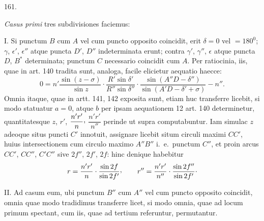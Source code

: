 \par{}\medskip
{}\begin{center}\hypertarget{native-224-article161}{}161.\end{center}
\emph{Casus primi} tres subdivisiones faciemus:

I. Si punctum $B$ cum $A$ vel cum puncto opposito coincidit, erit $\delta=0$
vel $=180^0$; $\gamma$, $\epsilon'$, $\epsilon''$ atque puncta $D'$, $D''$
indeterminata erunt; contra $\gamma'$, $\gamma''$, $\epsilon$ atque puncta $D$, $B^*$
determinata; punctum $C$ necessario coincidit cum $A$. Per ratiocinia, iis,
quae in art. 140 tradita sunt, analoga, facile elicietur aequatio haecce:
\[
0=n'\frac{\sin(z-\sigma)}{\sin z}\cdot\frac{R'\sin\delta'}{R''\sin\delta''}
\cdot\frac{\sin(A''D-\delta'')}{\sin(A'D-\delta'+\sigma)}-n''.
\]
Omnia itaque, quae in artt. 141, 142 exposita sunt, etiam huc transferre licebit,
si modo statuatur $a=0$, atque $b$ per ipsam aequationem 12 art. 140 determinetur,
quantitatesque $z$, $r'$, $\dfrac{n'r'}{n}\mathpunct{\raisebox{.45ex}{,}}$
$\dfrac{n'r'}{n''}$ perinde ut supra computabuntur. Iam simulac $z$ adeoque
situs puncti $C'$ innotuit, assignare licebit situm circuli maximi $CC'$, huius
intersectionem cum circulo maximo $A''B''$ i.\ e.\ punctum $C''$, et proin arcus
$CC'$, $CC''$, $C'C''$ sive $2f''$, $2f'$, $2f$: hinc denique habebitur
\[
r=\frac{n'r'}{n}\cdot\frac{\sin2f}{\sin2f'}\mathpunct{\raisebox{.45ex}{,}}\qquad
r''=\frac{n'r'}{n''}\cdot\frac{\sin2f''}{\sin2f'}\mathpunct{\cdot}
\]

II. Ad casum eum, ubi punctum $B''$ cum $A''$ vel cum puncto opposito coincidit,
omnia quae modo tradidimus transferre licet, si modo omnia, quae ad locum
primum spectant, cum iis, quae ad tertium referuntur, permutantur.

